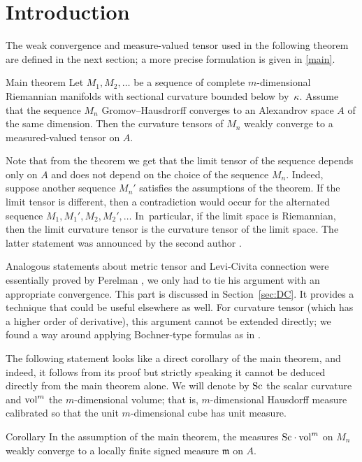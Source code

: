 \section{Introduction}

The weak convergence and measure-valued tensor used in the following theorem are defined in the next section;
a more precise formulation is given in \ref{main}.

\begin{thm}{Main theorem}
Let $M_1,M_2,\dots$ be a sequence of complete $m$-dimensional Riemannian manifolds with sectional curvature bounded below by~$\kappa$.
Assume that the sequence $M_n$ Gromov--Hausdrorff converges to an Alexandrov space $A$ of the same dimension.
Then the curvature tensors of $M_n$ weakly converge to a measured-valued tensor on $A$.
\end{thm}

Note that from the theorem we get that the limit tensor of the sequence depends only on $A$ and does not depend on the choice of the sequence $M_n$.
Indeed, suppose another sequence $M_n'$ satisfies the assumptions of the theorem.
If the limit tensor is different, 
then a contradiction would occur for the alternated sequence $M_1,M_1',M_2,M_2',\dots$ 
In~particular, if the limit space is Riemannian, then the limit curvature tensor is the curvature tensor of the limit space.
The latter statement was announced by the second author \cite{petrunin-poly}.

Analogous statements about metric tensor and Levi-Civita connection were essentially proved by Perelman \cite{PerDC},
we only had to tie his argument with an appropriate convergence.
This part is discussed in Section~\ref{sec:DC}. 
It provides a technique that could be useful elsewhere as well.
For curvature tensor (which has a higher order of derivative), this argument cannot be extended directly;
we found a way around applying Bochner-type formulas as in \cite{petrunin-SC}.

The following statement looks like a direct corollary of the main theorem, 
and indeed, it follows from its proof but strictly speaking it cannot be deduced directly from the main theorem alone.
We will denote by $\operatorname{\rm Sc}$ the scalar curvature and $\operatorname{vol}^m$ the $m$-dimensional volume; that is, $m$-dimensional Hausdorff measure calibrated so that the unit $m$-dimensional cube has unit measure.

\begin{thm}{Corollary}\label{cor:Sc}
In the assumption of the main theorem,
the measures $\Sc\cdot \vol^m$ on $M_n$ weakly converge to a locally finite signed measure $\mathfrak m$  on $A$.
\end{thm}

